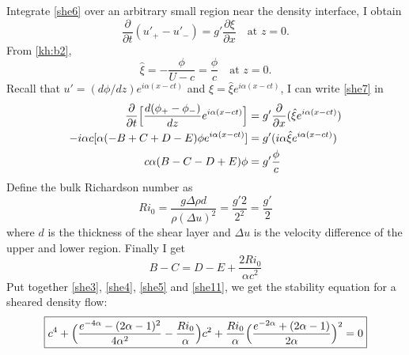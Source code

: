\newslide
Integrate \eqref{she6} over an arbitrary small region near the
density interface, I obtain
\begin{equation}\label{she7}
    \frac{\partial}{\partial t}(u'_+-u'_-)= g'\frac{\partial \xi}{\partial
    x}\quad \text{at $z=0$.}
\end{equation}
From \eqref{kh:b2},
\begin{equation}\label{she8}
\hat{\xi}=-\frac{\phi}{U-c}=\frac{\phi}{c}\quad\text{at $z=0$.}
\end{equation}
\newslide
Recall that $u'=(d\phi/dz) e^{i\alpha( x - ct)}$ and $\xi=\hat\xi
e^{i\alpha( x - ct)}$, I can write \eqref{she7} in
\begin{align*}
    \frac{\partial}{\partial t}\Bigl[\frac{d(\phi_+-\phi_-)}{dz}e^{i\alpha( x - ct)}\Bigr]
    &= g'\frac{\partial}{\partial
    x}(\hat\xi e^{i\alpha( x - ct)})\\
    -i\alpha c[\alpha(-B+C+D-E)\phi e^{i\alpha( x - ct)}]
    &= g'(i\alpha\hat\xi e^{i\alpha( x - ct)})\\
    c\alpha(B-C-D+E)\phi &= g'\frac{\phi}{c}
\end{align*}
\newslide
Define the bulk Richardson number as
\begin{equation}\label{she10}
    Ri_0=\frac{g\Delta\rho d}{\rho(\Delta u)^2}=\frac{g' 2}{2^2}=\frac{g'}{2}
\end{equation}
where $d$ is the thickness of the shear layer and $\Delta u$ is the
velocity difference of the upper and lower region. Finally I get
\begin{equation}\label{she11}
    B-C=D-E+\frac{2Ri_0}{\alpha c^2}
\end{equation}
\newslide
Put together \eqref{she3}, \eqref{she4}, \eqref{she5} and
\eqref{she11}, we get the stability equation for a sheared density
flow:
\begin{equation}\label{she12}
\boxed{c^4+\Bigl(\frac{e^{-4\alpha}-(2\alpha-1)^2}{4\alpha^2}-\frac{Ri_0}{\alpha}\Bigr)c^2
+\frac{Ri_0}{\alpha}\Bigl(\frac{e^{-2\alpha}+(2\alpha-1)}{2\alpha}\Bigr)^2=0}
\end{equation}

